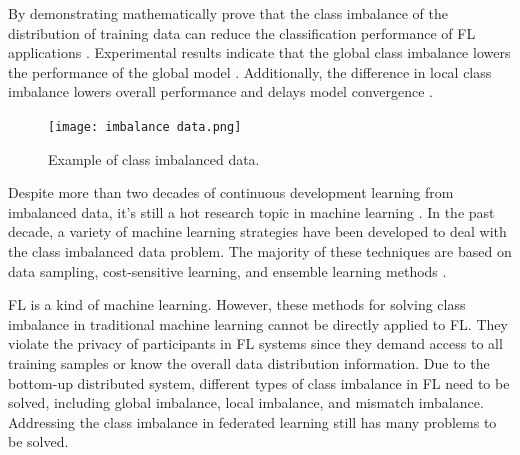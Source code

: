 \documentclass[10pt,journal,compsoc]{IEEEtran}
\begin{document}
	By demonstrating mathematically prove that the class imbalance of the distribution of training data can reduce the classification performance of FL applications \cite{duan2019astraea}. Experimental results indicate that the global class imbalance lowers the performance of the global model \cite{xiao2021experimental} \cite{chou2022grp}. Additionally, the difference in local class imbalance lowers overall performance and delays model convergence \cite{sittijuk2021performance} \cite{diwangkara2020study}. 
	
	\begin{figure}[h]
		\centering
		\texttt{[image: imbalance data.png]}
		\caption{Example of class imbalanced data.}
		\label{Example of imbalanced data}
	\end{figure}
	
	Despite more than two decades of continuous development learning from imbalanced data, it's still a hot research topic in machine learning \cite{krawczyk2016learning}. In the past decade, a variety of machine learning strategies have been developed to deal with the class imbalanced data problem. The majority of these techniques are based on data sampling, cost-sensitive learning, and ensemble learning methods \cite{galar2011review} \cite{krawczyk2014cost} \cite{loyola2016study}.
	
	FL is a kind of machine learning. However, these methods for solving class imbalance in traditional machine learning cannot be directly applied to FL. They violate the privacy of participants in FL systems since they demand access to all training samples or know the overall data distribution information. Due to the bottom-up distributed system, different types of class imbalance in FL need to be solved, including global imbalance, local imbalance, and mismatch imbalance. Addressing the class imbalance in federated learning still has many problems to be solved.
	
\end{document}
